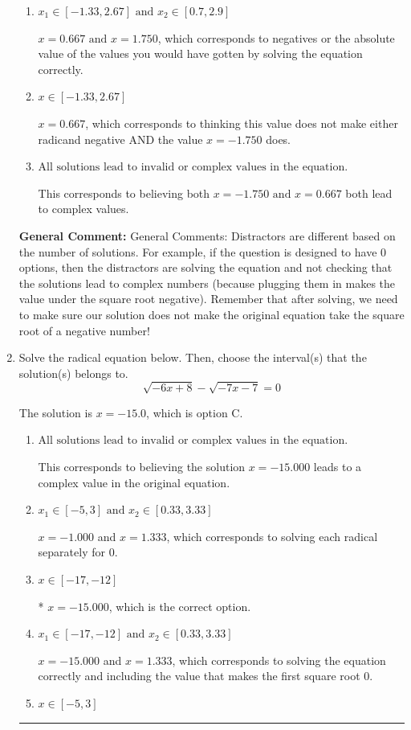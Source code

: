 \documentclass{extbook}[14pt]
\newcommand{\litem}[1]{\item #1

\rule{\textwidth}{0.4pt}}
\begin{document}
\begin{enumerate}
{\begin{enumerate}[label=\Alph*.]
* This is the correct option.
\item \( x_1 \in [-1.33, 2.67] \text{ and } x_2 \in [0.7,2.9] \)

$x = 0.667 \text{ and } x = 1.750$, which corresponds to negatives or the absolute value of the values you would have gotten by solving the equation correctly.
\item \( x \in [-1.33,2.67] \)

$x = 0.667$, which corresponds to thinking this value does not make either radicand negative AND the value $x = -1.750$ does.
\item \( \text{All solutions lead to invalid or complex values in the equation.} \)

This corresponds to believing both $x = -1.750 \text{ and } x = 0.667$ both lead to complex values.
\end{enumerate}

\textbf{General Comment:} General Comments: Distractors are different based on the number of solutions. For example, if the question is designed to have 0 options, then the distractors are solving the equation and not checking that the solutions lead to complex numbers (because plugging them in makes the value under the square root negative). Remember that after solving, we need to make sure our solution does not make the original equation take the square root of a negative number!
}
\litem{
Solve the radical equation below. Then, choose the interval(s) that the solution(s) belongs to.
\[ \sqrt{-6 x + 8} - \sqrt{-7 x - 7} = 0 \]

The solution is \( x = -15.0 \), which is option C.\begin{enumerate}[label=\Alph*.]
\item \( \text{All solutions lead to invalid or complex values in the equation.} \)

This corresponds to believing the solution $x = -15.000$ leads to a complex value in the original equation.
\item \( x_1 \in [-5, 3] \text{ and } x_2 \in [0.33,3.33] \)

$x = -1.000$ and $x = 1.333$, which corresponds to solving each radical separately for 0.
\item \( x \in [-17,-12] \)

* $x = -15.000$, which is the correct option.
\item \( x_1 \in [-17, -12] \text{ and } x_2 \in [0.33,3.33] \)

$x = -15.000$ and $x = 1.333$, which corresponds to solving the equation correctly and including the value that makes the first square root 0.
\item \( x \in [-5,3] \)


\end{enumerate}}
\end{enumerate}
\end{document}
